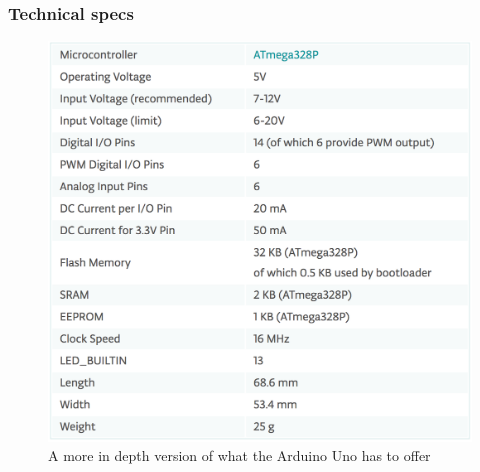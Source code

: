 \begin{frame}
	\frametitle{Technical specs}
	\begin{figure}
		\includegraphics[scale=.14]{assets/spec} 
		\caption{A more in depth version of what the Arduino Uno has to offer}
	\end{figure}
\end{frame}

